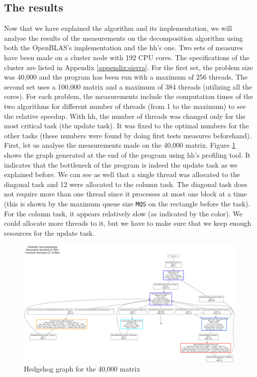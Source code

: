 \clearpage{}
\subsection{The results}
\label{sec:chores}

Now that we have explained the algorithm and its implementation, we will analyse
the results of the measurements on the decomposition algorithm using both the
OpenBLAS's implementation and the \gls{hh}'s one. Two sets of measures have been
made on a cluster node with 192 CPU cores. The specifications of the cluster are
listed in Appendix \ref{appendix:sierra}. For the first set, the problem
size was 40,000 and the program has been run with a maximum of 256 threads.
The second set uses a 100,000 matrix and a maximum of 384 threads (utilizing all
the cores). For each problem, the measurements include the computation times of
the two algorithms for different number of threads (from 1 to the maximum) to see
the relative speedup. With \gls{hh}, the number of threads was changed only for
the most critical task (the update task). It was fixed to the optimal numbers
for the other tasks (these numbers were found by doing first tests measures
beforehand).\\

First, let us analyse the measurements made on the 40,000 matrix. Figure
\ref{fig:40000graph} shows the graph generated at the end of the program using
\gls{hh}'s profiling tool. It indicates that the bottleneck of the program is
indeed the update task as we explained before. We can see as well that a single
thread was allocated to the diagonal task and 12 were allocated to the column
task. The diagonal task does not require more than one thread since it processes
at most one block at a time (this is shown by the maximum queue size
\texttt{MQS} on the rectangle before the task). For the column task, it appears
relatively slow (as indicated by the color). We could allocate more threads to
it, but we have to make sure that we keep enough resources for the update task.

\begin{figure}[!ht]
  \begin{center}
    \includegraphics[scale=0.15]{img/cho-img/40000.png}
    \caption{Hedgehog graph for the 40,000 matrix}
    \label{fig:40000graph}
  \end{center}
\end{figure}

